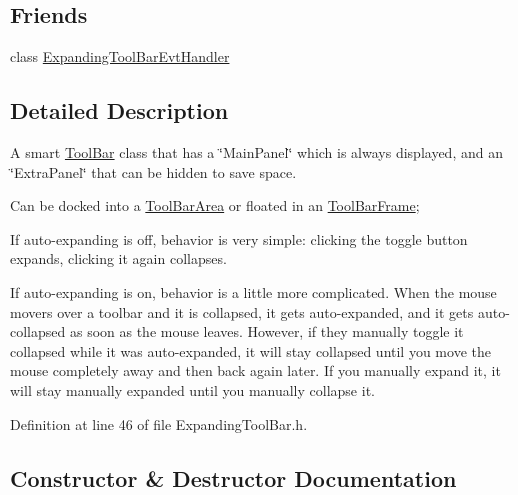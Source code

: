 \subsection*{Friends}
\begin{DoxyCompactItemize}
\item 
class \hyperlink{class_expanding_tool_bar_a6391afea61a5511a349761ce7c4b17bc}{Expanding\+Tool\+Bar\+Evt\+Handler}
\end{DoxyCompactItemize}


\subsection{Detailed Description}
A smart \hyperlink{class_tool_bar}{Tool\+Bar} class that has a \char`\"{}\+Main\+Panel\char`\"{} which is always displayed, and an \char`\"{}\+Extra\+Panel\char`\"{} that can be hidden to save space. 

Can be docked into a \hyperlink{class_tool_bar_area}{Tool\+Bar\+Area} or floated in an \hyperlink{class_tool_bar_frame}{Tool\+Bar\+Frame};

If auto-\/expanding is off, behavior is very simple\+: clicking the toggle button expands, clicking it again collapses.

If auto-\/expanding is on, behavior is a little more complicated. When the mouse movers over a toolbar and it is collapsed, it gets auto-\/expanded, and it gets auto-\/collapsed as soon as the mouse leaves. However, if they manually toggle it collapsed while it was auto-\/expanded, it will stay collapsed until you move the mouse completely away and then back again later. If you manually expand it, it will stay manually expanded until you manually collapse it. 

Definition at line 46 of file Expanding\+Tool\+Bar.\+h.



\subsection{Constructor \& Destructor Documentation}
